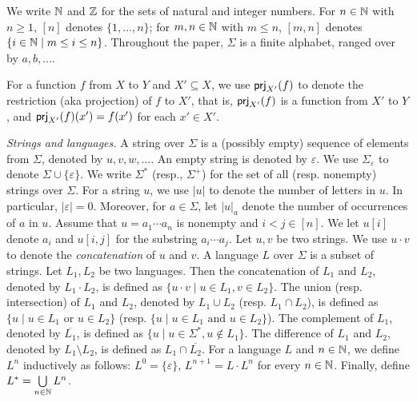 %

We write $\mathbb{N}$ and $\mathbb{Z}$ for the sets of natural and integer numbers. For $n \in \mathbb{N}$ with $n \ge 1$, $[n]$ denotes $\{1, \ldots, n\}$; for $m,n \in \mathbb{N}$ with $m \le n$,  $[m, n]$ denotes $\{ i \in \mathbb{N} \mid m \le i \le n \}$. Throughout the paper, $\Sigma$ is a finite alphabet, ranged over by $a,b,\ldots$.  

For a function $f$ from $X$ to $Y$ and $X' \subseteq X$, we use ${\sf prj}_{X'}(f)$ to denote the restriction (aka projection) of $f$ to $X'$, that is, ${\sf prj}_{X'}(f)$ is a function from $X'$ to $Y$, and ${\sf prj}_{X'}(f)(x') = f(x')$ for each $x' \in X'$.

\medskip
\noindent \emph{Strings and languages.}
A string over $\Sigma$ is a (possibly empty) sequence of elements from $\Sigma$,
denoted by $u, v, w, \ldots$. An empty string is denoted by $\varepsilon$. We use $\Sigma_\varepsilon$ to denote $\Sigma \cup \{\varepsilon\}$. We write $\Sigma^*$ (resp., $\Sigma^+$) for the set of all (resp. nonempty) strings over $\Sigma$.
For a string $u$, we use $|u|$ to denote the number of letters in $u$. In particular, $|\varepsilon|=0$. 
Moreover, for $a \in \Sigma$, let $|u|_a$ denote the number of occurrences of $a$ in $u$. 
Assume that $u=a_1\cdots a_{n}$ is nonempty and $i<j \in [n]$. %
We let $u[i]$ denote $a_i$ and $u[i,j]$ for the substring %
$a_i\cdots a_j$. 
%
Let $u, v$ be two strings. We use $u \cdot v$ to denote the \emph{concatenation} of $u$ and $v$. A language $L$ over $\Sigma$ is a subset of strings.  
Let $L_1, L_2$ be two languages. Then the concatenation of $L_1$ and $L_2$, denoted by $L_1 \cdot L_2$,  is defined as $\{u \cdot v \mid u \in L_1, v \in L_2\}$. The union (resp. intersection) of $L_1$ and $L_2$, denoted by $L_1 \cup L_2$  (resp. $L_1 \cap L_2$), is defined as $\{u \mid u \in L_1 \mbox{ or } u \in L_2\}$ (resp. $\{u \mid u \in L_1 \mbox{ and } u \in L_2\}$). The complement of $L_1$, denoted by $\overline{L_1}$, is defined as $\{u \mid u \in \Sigma^*, u \not \in L_1\}$. 
The difference of $L_1$ and $L_2$, denoted by $L_1 \setminus L_2$, is defined as $L_1 \cap \overline{L_2}$. 
For a language $L$ and $n \in \mathbb{N}$, we define $L^n$ inductively as follows: $L^0= \{\varepsilon\}$, $L^{n+1} = L \cdot L^n$ for every $n \in \mathbb{N}$. 
Finally, define $L^* = \bigcup \limits_{n \in \mathbb{N}} L^n$.


